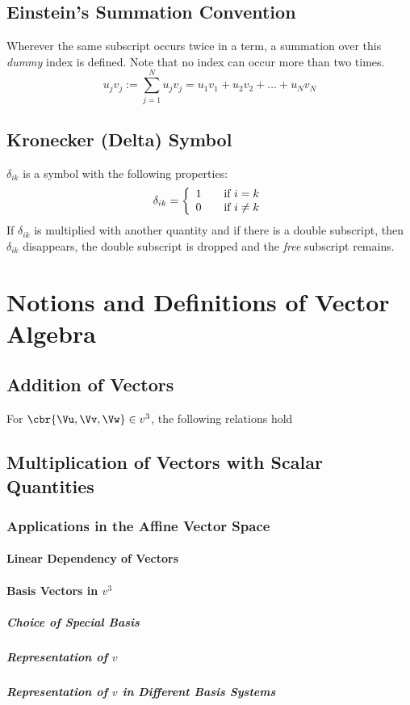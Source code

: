 \documentclass[a5paper,twosided,11pt,DIV=15,BCOR=0mm]{scrbook}
\begin{document}
\subsection{Einstein's Summation Convention}
Wherever the same subscript occurs twice in a term, a summation over this
\emph{dummy} index is defined. Note that no index can occur more than two times.
%
\begin{equation}
  u_jv_j := \sum\limits_{j=1}^N u_jv_j = u_1v_1 + u_2v_2 + \ldots + u_Nv_N
\end{equation}

%
\subsection{Kronecker (Delta) Symbol}
$\delta_{ik}$ is a symbol with the following properties:
%
\begin{equation}
  \delta_{ik} = \left\{
    \begin{array}{l l}
      1 & \quad \text{if $i=k$}\\
      0 & \quad \text{if $i\neq k$}
    \end{array} \right.
\end{equation}
%
If $\delta_{ik}$ is multiplied with another quantity and if there is a double
subscript, then $\delta_{ik}$ disappears, the double subscript is dropped and
the \emph{free} subscript remains.
%
\section{Notions and Definitions of Vector Algebra}
\subsection{Addition of Vectors}
For $\cbr{\Vu,\Vv,\Vw}\in v^3$, the following relations hold
%
\subsection{Multiplication of Vectors with Scalar Quantities}
%
\subsubsection{Applications in the Affine Vector Space}
%
\paragraph{Linear Dependency of Vectors}
%
\paragraph{Basis Vectors in $v^3$}
%
\subparagraph{Choice of Special Basis}
%
\subparagraph{Representation of $v$}
%
\begin{remark}

\end{remark}
%
\subparagraph{Representation of $v$ in Different Basis Systems}
%
\end{document}
